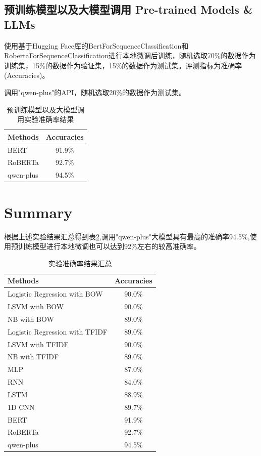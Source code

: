 \documentclass{article}
\begin{document}
\subsection{预训练模型以及大模型调用 Pre-trained Models \& LLMs}
使用基于Hugging Face库的BertForSequenceClassification和RobertaForSequenceClassification进行本地微调后训练，随机选取70\%的数据作为训练集，15\%的数据作为验证集，15\%的数据作为测试集。评测指标为准确率(Accuracies)。

调用"qwen-plus"的API，随机选取20\%的数据作为测试集。

\begin{table}[htbp]
    \centering
    \caption{预训练模型以及大模型调用实验准确率结果}
    \label{tab:Accuracies of experiments_4}
    \begin{tabular}{lc} 
        \toprule 
        Methods & Accuracies \\
        \midrule 
        BERT & 91.9\% \\
        RoBERTa & 92.7\% \\
        qwen-plus & 94.5\% \\
        \bottomrule 
    \end{tabular}
\end{table}

\section{Summary}
根据上述实验结果汇总得到表\ref{tab:Accuracies of All_experiments},调用"qwen-plus"大模型具有最高的准确率94.5\%,使用预训练模型进行本地微调也可以达到92\%左右的较高准确率。


\begin{table}[htbp] 
    \centering
    \caption{实验准确率结果汇总}
    \label{tab:Accuracies of All_experiments}
    \begin{tabular}{lc} 
        \toprule 
        Methods & Accuracies \\
        \midrule 
        Logistic Regression with BOW & 90.0\% \\
        LSVM with BOW & 90.0\% \\
        NB with BOW & 89.0\% \\
        Logistic Regression with TFIDF & 89.0\% \\
        LSVM with TFIDF & 90.0\% \\
        NB with TFIDF & 89.0\% \\
        MLP & 87.0\% \\
        RNN & 84.0\% \\
        LSTM & 88.9\% \\
        1D CNN & 89.7\% \\
        BERT & 91.9\% \\
        RoBERTa & 92.7\% \\
        qwen-plus & 94.5\% \\
        \bottomrule 
    \end{tabular}
\end{table}
\end{document}
